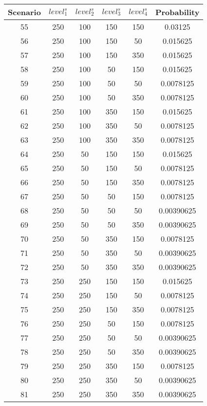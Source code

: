 \documentclass{article}
\begin{document}
\pagebreak
\begin{table}[ht]
        \centering
        \begin{tabular}{|c|c c c c|c|}
                \hline
                Scenario & \(level_{1}^{s}\) & \(level_{2}^{s}\) & \(level_{3}^{s}\) & \(level_{4}^{s}\) & Probability\\
                \hline
                55 & 250 & 100 & 150 & 150 & 0.03125\\\hline
                56 & 250 & 100 & 150 & 50 & 0.015625\\\hline
                57 & 250 & 100 & 150 & 350 & 0.015625\\\hline
                58 & 250 & 100 & 50 & 150 & 0.015625\\\hline
                59 & 250 & 100 & 50 & 50 & 0.0078125\\\hline
                60 & 250 & 100 & 50 & 350 & 0.0078125\\\hline
                61 & 250 & 100 & 350 & 150 & 0.015625\\\hline
                62 & 250 & 100 & 350 & 50 & 0.0078125\\\hline
                63 & 250 & 100 & 350 & 350 & 0.0078125\\\hline
                64 & 250 & 50 & 150 & 150 & 0.015625\\\hline
                65 & 250 & 50 & 150 & 50 & 0.0078125\\\hline
                66 & 250 & 50 & 150 & 350 & 0.0078125\\\hline
                67 & 250 & 50 & 50 & 150 & 0.0078125\\\hline
                68 & 250 & 50 & 50 & 50 & 0.00390625\\\hline
                69 & 250 & 50 & 50 & 350 & 0.00390625\\\hline
                70 & 250 & 50 & 350 & 150 & 0.0078125\\\hline
                71 & 250 & 50 & 350 & 50 & 0.00390625\\\hline
                72 & 250 & 50 & 350 & 350 & 0.00390625\\\hline
                73 & 250 & 250 & 150 & 150 & 0.015625\\\hline
                74 & 250 & 250 & 150 & 50 & 0.0078125\\\hline
                75 & 250 & 250 & 150 & 350 & 0.0078125\\\hline
                76 & 250 & 250 & 50 & 150 & 0.0078125\\\hline
                77 & 250 & 250 & 50 & 50 & 0.00390625\\\hline
                78 & 250 & 250 & 50 & 350 & 0.00390625\\\hline
                79 & 250 & 250 & 350 & 150 & 0.0078125\\\hline
                80 & 250 & 250 & 350 & 50 & 0.00390625\\\hline
                81 & 250 & 250 & 350 & 350 & 0.00390625\\\hline
        \end{tabular}
\end{table}
\end{document}
